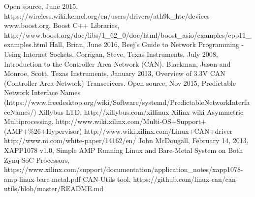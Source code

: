 \begin{thebibliography}{11} %
			Open source, June 2015, https://wireless.wiki.kernel.org/en/users/drivers/ath9k\_htc/devices
			www.boost.org, Boost C++ Libraries, http://www.boost.org/doc/libs/1\_62\_0/doc/html/boost\_asio/examples/cpp11\_examples.html
			Hall, Brian, June 2016, Beej's Guide to Network Programming - Using Internet Sockets.
			Corrigan, Steve, Texas Instruments, July 2008, Introduction to the Controller Area Network (CAN).
			Blackman, Jason and Monroe, Scott, Texas Instruments, January 2013, Overview of 3.3V CAN (Controller Area Network) Transceivers.
			Open source, Nov 2015, Predictable Network Interface Names (https://www.freedesktop.org/wiki/Software/systemd/PredictableNetworkInterfaceNames/)
			Xillybus LTD, http://xillybus.com/xillinux
			Xilinx wiki Asymmetric Multiprocessing, http://www.wiki.xilinx.com/Multi-OS+Support+(AMP+\%26+Hypervisor)
			http://www.wiki.xilinx.com/Linux+CAN+driver
			http://www.ni.com/white-paper/14162/en/
			John McDougall, February 14, 2013, XAPP1078 v1.0, Simple AMP Running Linux and Bare-Metal System on Both Zynq SoC Processors, https://www.xilinx.com/support/documentation/application\_notes/xapp1078-amp-linux-bare-metal.pdf
			CAN-Utils tool, https://github.com/linux-can/can-utils/blob/master/README.md
\end{thebibliography}